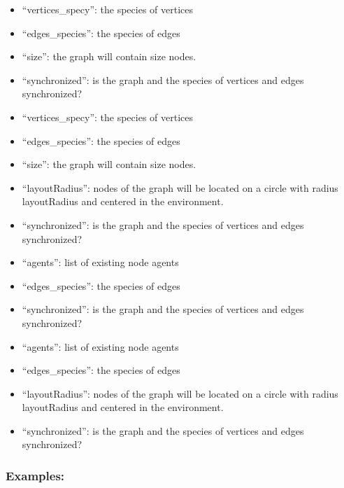 \documentclass[]{book}
\providecommand{\tightlist}{%
  \setlength{\itemsep}{0pt}\setlength{\parskip}{0pt}}
\theoremstyle{definition}
\theoremstyle{definition}
\theoremstyle{definition}
\theoremstyle{remark}
\begin{document}
\begin{itemize}
\tightlist
\item
  ``vertices\_specy'': the species of vertices\\
\item
  ``edges\_species'': the species of edges\\
\item
  ``size'': the graph will contain size nodes.\\
\item
  ``synchronized'': is the graph and the species of vertices and edges
  synchronized?\\
\item
  ``vertices\_specy'': the species of vertices\\
\item
  ``edges\_species'': the species of edges\\
\item
  ``size'': the graph will contain size nodes.\\
\item
  ``layoutRadius'': nodes of the graph will be located on a circle with
  radius layoutRadius and centered in the environment.\\
\item
  ``synchronized'': is the graph and the species of vertices and edges
  synchronized?\\
\item
  ``agents'': list of existing node agents\\
\item
  ``edges\_species'': the species of edges\\
\item
  ``synchronized'': is the graph and the species of vertices and edges
  synchronized?\\
\item
  ``agents'': list of existing node agents\\
\item
  ``edges\_species'': the species of edges\\
\item
  ``layoutRadius'': nodes of the graph will be located on a circle with
  radius layoutRadius and centered in the environment.\\
\item
  ``synchronized'': is the graph and the species of vertices and edges
  synchronized?
\end{itemize}

\subsubsection{Examples:}\label{examples-137}
\end{document}
